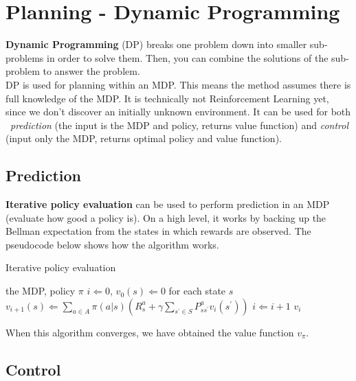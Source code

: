 \chapter{Planning - Dynamic Programming}

\textbf{Dynamic Programming} (DP) breaks one problem down into smaller sub-problems in order to solve them. Then, you can combine the solutions of the sub-problem to answer the problem.\\

DP is used for planning within an MDP. This means the method assumes there is full knowledge of the MDP. It is technically not Reinforcement Learning yet, since we don't discover an initially unknown environment. It can be used for both \ \textit{prediction} (the input is the MDP and policy, returns value function) and \textit{control} (input only the MDP, returns optimal policy and value function).

\section{Prediction}

\textbf{Iterative policy evaluation} can be used to perform prediction in an MDP (evaluate how good a policy is). On a high level, it works by backing up the Bellman expectation from the states in which rewards are observed. The pseudocode below shows how the algorithm works.

\begin{algorithm}[H]
\caption{Iterative policy evaluation}
\label{alg:it-pol-eval}
    \begin{algorithmic}
    	\REQUIRE the MDP, policy $\pi$
    	\STATE $i \Leftarrow 0$, $v_0(s) \Leftarrow 0$ for each state $s$
        		\STATE $v_{i+1}(s) \Leftarrow 
        		\sum_{a \in A} \pi(a|s) \left(R^a_s + \gamma \sum_{s^\prime \in S} P^a_{ss^\prime} v_i(s^\prime) \right)$
        	\ENDFOR
        	\STATE $i \Leftarrow i + 1$
        \ENDWHILE
        \RETURN $v_i$
    \end{algorithmic}
\end{algorithm}

When this algorithm converges, we have obtained the value function $v_\pi$.

\section{Control}

